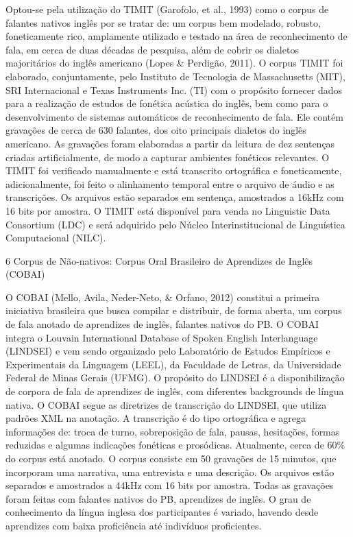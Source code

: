 Optou-se pela utiliza\c{c}\~ao do TIMIT (Garofolo, et al., 1993) como o corpus
de falantes nativos ingl\^es por se tratar de: um corpus bem modelado,
robusto, foneticamente rico, amplamente utilizado e testado na \'area de
reconhecimento de fala, em cerca de duas d\'ecadas de pesquisa, al\'em de
cobrir os dialetos majorit\'arios do ingl\^es americano (Lopes \& Perdig\~ao,
2011). O corpus TIMIT foi elaborado, conjuntamente, pelo Instituto de
Tecnologia de Massachusetts (MIT), SRI Internacional e Texas Instruments
Inc. (TI) com o prop\'osito fornecer dados para a realiza\c{c}\~ao de estudos de
fon\'etica ac\'ustica do ingl\^es, bem como para o desenvolvimento de sistemas
autom\'aticos de reconhecimento de fala. Ele cont\'em grava\c{c}\~oes de cerca de
630 falantes, dos oito principais dialetos do ingl\^es americano. As
grava\c{c}\~oes foram elaboradas a partir da leitura de dez senten\c{c}as criadas
artificialmente, de modo a capturar ambientes fon\'eticos relevantes. O
TIMIT foi verificado manualmente e est\'a transcrito ortogr\'afica e
foneticamente, adicionalmente, foi feito o alinhamento temporal entre o
arquivo de \'audio e as transcri\c{c}\~oes. Os arquivos est\~ao separados em
senten\c{c}a, amostrados a 16kHz com 16 bits por amostra. O TIMIT est\'a
dispon\'ivel para venda no Linguistic Data Consortium (LDC) e ser\'a
adquirido pelo N\'ucleo Interinstitucional de Lingu\'istica Computacional
(NILC).

6 Corpus de N\~ao-nativos: Corpus Oral Brasileiro de Aprendizes de Ingl\^es
(COBAI)

O COBAI (Mello, Avila, Neder-Neto, \& Orfano, 2012) constitui a primeira
iniciativa brasileira que busca compilar e distribuir, de forma aberta,
um corpus de fala anotado de aprendizes de ingl\^es, falantes nativos do
PB. O COBAI integra o Louvain International Database of Spoken English
Interlanguage (LINDSEI) e vem sendo organizado pelo Laborat\'orio de
Estudos Emp\'iricos e Experimentais da Linguagem (LEEL), da Faculdade de
Letras, da Universidade Federal de Minas Gerais (UFMG). O prop\'osito do
LINDSEI \'e a disponibiliza\c{c}\~ao de corpora de fala de aprendizes de ingl\^es,
com diferentes backgrounds de l\'ingua nativa. O COBAI segue as diretrizes
de transcri\c{c}\~ao do LINDSEI, que utiliza padr\~oes XML na anota\c{c}\~ao. A
transcri\c{c}\~ao \'e do tipo ortogr\'afica e agrega informa\c{c}\~oes de: troca de
turno, sobreposi\c{c}\~ao de fala, pausas, hesita\c{c}\~oes, formas reduzidas e
algumas indica\c{c}\~oes fon\'eticas e pros\'odicas. Atualmente, cerca de 60\% do
corpus est\'a anotado. O corpus consiste em 50 grava\c{c}\~oes de 15 minutos,
que incorporam uma narrativa, uma entrevista e uma descri\c{c}\~ao. Os
arquivos est\~ao separados e amostrados a 44kHz com 16 bits por amostra.
Todas as grava\c{c}\~oes foram feitas com falantes nativos do PB, aprendizes
de ingl\^es. O grau de conhecimento da l\'ingua inglesa dos participantes \'e
variado, havendo desde aprendizes com baixa profici\^encia at\'e indiv\'iduos
proficientes.

